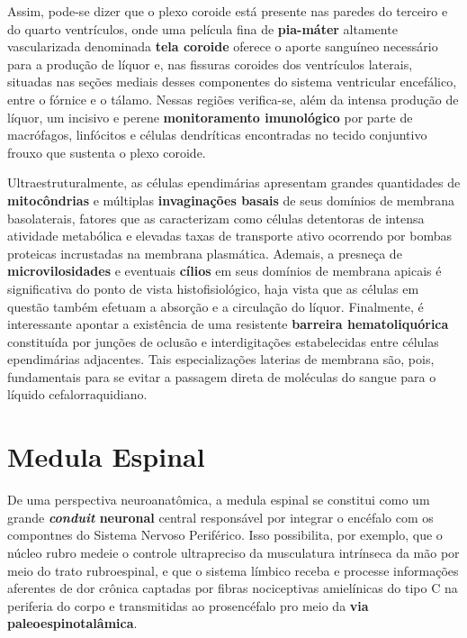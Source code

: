 \documentclass[
]{book}
\theoremstyle{definition}
\theoremstyle{definition}
\theoremstyle{definition}
\theoremstyle{definition}
\theoremstyle{remark}
\begin{document}
Assim, pode-se dizer que o plexo coroide está presente nas paredes do terceiro e do quarto ventrículos, onde uma película fina de \textbf{pia-máter} altamente vascularizada denominada \textbf{tela coroide} oferece o aporte sanguíneo necessário para a produção de líquor e, nas fissuras coroides dos ventrículos laterais, situadas nas seções mediais desses componentes do sistema ventricular encefálico, entre o fórnice e o tálamo. Nessas regiões verifica-se, além da intensa produção de líquor, um incisivo e perene \textbf{monitoramento imunológico} por parte de macrófagos, linfócitos e células dendríticas encontradas no tecido conjuntivo frouxo que sustenta o plexo coroide.

Ultraestruturalmente, as células ependimárias apresentam grandes quantidades de \textbf{mitocôndrias} e múltiplas \textbf{invaginações basais} de seus domínios de membrana basolaterais, fatores que as caracterizam como células detentoras de intensa atividade metabólica e elevadas taxas de transporte ativo ocorrendo por bombas proteicas incrustadas na membrana plasmática. Ademais, a presneça de \textbf{microvilosidades} e eventuais \textbf{cílios} em seus domínios de membrana apicais é significativa do ponto de vista histofisiológico, haja vista que as células em questão também efetuam a absorção e a circulação do líquor. Finalmente, é interessante apontar a existência de uma resistente \textbf{barreira hematoliquórica} constituída por junções de oclusão e interdigitações estabelecidas entre células ependimárias adjacentes. Tais especializações laterias de membrana são, pois, fundamentais para se evitar a passagem direta de moléculas do sangue para o líquido cefalorraquidiano.

\hypertarget{medula-espinal}{%
\chapter{Medula Espinal}\label{medula-espinal}}

De uma perspectiva neuroanatômica, a medula espinal se constitui como um grande \textbf{\emph{conduit} neuronal} central responsável por integrar o encéfalo com os compontnes do Sistema Nervoso Periférico. Isso possibilita, por exemplo, que o núcleo rubro medeie o controle ultrapreciso da musculatura intrínseca da mão por meio do trato rubroespinal, e que o sistema límbico receba e processe informações aferentes de dor crônica captadas por fibras nociceptivas amielínicas do tipo C na periferia do corpo e transmitidas ao prosencéfalo pro meio da \textbf{via paleoespinotalâmica}.
\end{document}
